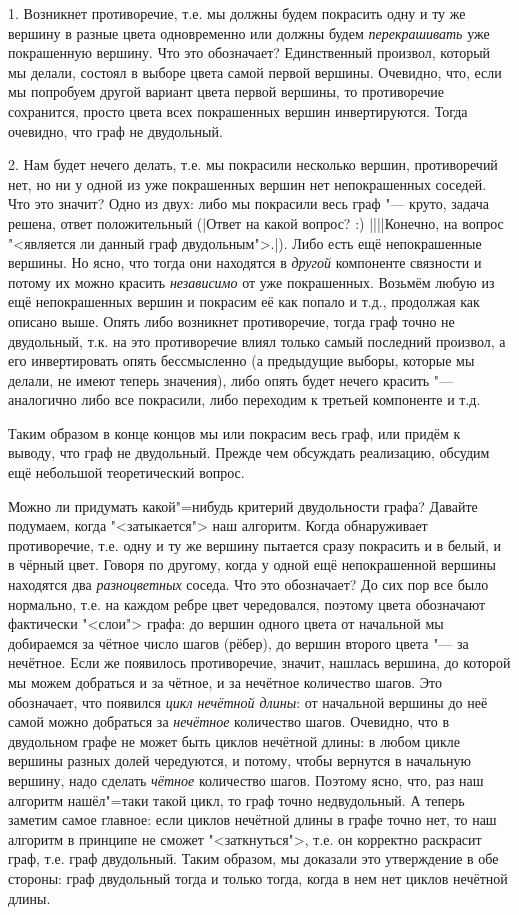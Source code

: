 1. Возникнет противоречие, т.е. мы должны будем покрасить одну и ту же вершину в разные цвета 
одновременно или должны будем \textit{перекрашивать} уже покрашенную вершину. Что это обозначает? 
Единственный произвол, который мы делали, состоял в выборе цвета самой первой вершины. Очевидно, 
что, если мы попробуем другой вариант цвета первой вершины, то противоречие сохранится, просто 
цвета всех покрашенных вершин инвертируются. Тогда очевидно, что граф не двудольный.

2. Нам будет нечего делать, т.е. мы покрасили несколько вершин, противоречий нет, но ни у одной из 
уже покрашенных вершин нет непокрашенных соседей. Что это значит? Одно из двух: либо мы покрасили 
весь граф "--- круто, задача решена, ответ положительный (|Ответ на 
какой вопрос? :) ||||Конечно, на вопрос "<является ли данный граф двудольным">.|\label{whichtask}).  
Либо есть ещё непокрашенные вершины. Но ясно, что тогда они находятся в 
\textit{другой} компоненте связности и потому их можно красить \textit{независимо} от уже 
покрашенных. Возьмём любую из ещё непокрашенных вершин и покрасим её как попало и т.д., продолжая 
как описано выше. Опять либо возникнет противоречие, тогда граф точно не двудольный, т.к. на это 
противоречие влиял только самый последний произвол, а его инвертировать опять бессмысленно (а 
предыдущие выборы, которые мы делали, не имеют теперь значения), либо опять будет нечего красить 
"--- аналогично либо все покрасили, либо переходим к третьей компоненте и т.д.

Таким образом в конце концов мы или покрасим весь граф, или придём к выводу, что граф не 
двудольный. Прежде чем обсуждать реализацию, обсудим ещё небольшой теоретический вопрос.

Можно ли придумать какой"=нибудь критерий двудольности графа? Давайте подумаем, когда 
"<затыкается"> наш алгоритм. Когда обнаруживает противоречие, т.е. одну и ту же вершину пытается 
сразу покрасить и в белый, и в чёрный цвет. Говоря по другому, когда у одной ещё непокрашенной 
вершины находятся два \textit{разноцветных} соседа. Что это обозначает? До сих пор все было 
нормально, т.е. на каждом ребре цвет чередовался, поэтому цвета обозначают фактически "<слои"> 
графа: до вершин одного цвета от начальной мы добираемся за чётное число шагов (рёбер), до вершин второго 
цвета "--- за нечётное. Если же появилось противоречие, значит, нашлась вершина, до которой мы 
можем добраться и за чётное, и за нечётное количество шагов. Это обозначает, что появился 
\textit{цикл нечётной длины}: от начальной вершины до неё самой можно добраться за \textit{нечётное} 
количество шагов. Очевидно, что в двудольном графе не может быть циклов нечётной длины: в любом 
цикле вершины разных долей чередуются, и потому, чтобы вернутся в начальную вершину, надо сделать 
\textit{чётное} количество шагов. Поэтому ясно, что, раз наш алгоритм нашёл"=таки такой цикл, то 
граф точно недвудольный. А теперь заметим самое главное: если циклов нечётной длины в графе точно 
нет, то наш алгоритм в принципе не сможет "<заткнуться">, т.е. он корректно раскрасит граф, т.е. 
граф двудольный. Таким образом, мы доказали это утверждение в обе стороны: граф двудольный тогда и 
только тогда, когда в нем нет циклов нечётной длины.

